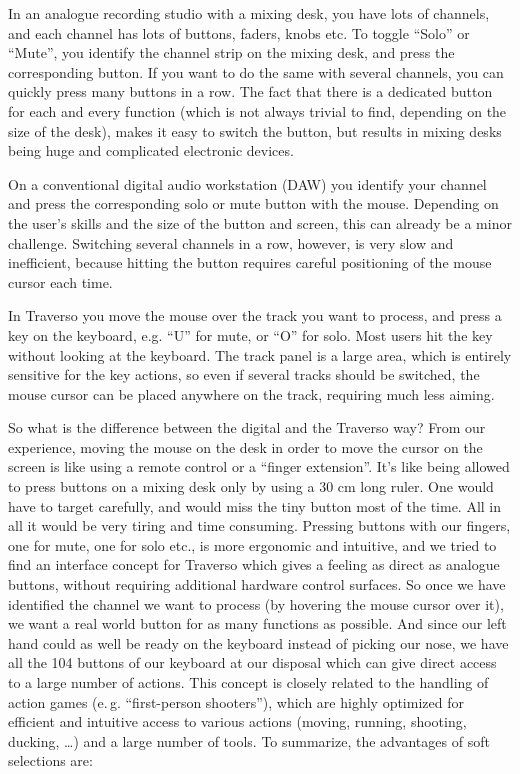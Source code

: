 In an analogue recording studio with a mixing desk, you have lots of channels, and each channel has lots of buttons, faders, knobs etc. To toggle ``Solo'' or ``Mute'', you identify the channel strip on the mixing desk, and press the corresponding button. If you want to do the same with several channels, you can quickly press many buttons in a row. The fact that there is a dedicated button for each and every function (which is not always trivial to find, depending on the size of the desk), makes it easy to switch the button, but results in mixing desks being huge and complicated electronic devices.

On a conventional digital audio workstation (DAW) you identify your channel and press the corresponding solo or mute button with the mouse. Depending on the user's skills and the size of the button and screen, this can already be a minor challenge. Switching several channels in a row, however, is very slow and inefficient, because hitting the button requires careful positioning of the mouse cursor each time.

In Traverso you move the mouse over the track you want to process, and press a key on the keyboard, e.g. ``U'' for mute, or ``O'' for solo. Most users hit the key without looking at the keyboard. The track panel is a large area, which is entirely sensitive for the key actions, so even if several tracks should be switched, the mouse cursor can be placed anywhere on the track, requiring much less aiming.

So what is the difference between the digital and the Traverso way? From our experience, moving the mouse on the desk in order to move the cursor on the screen is like using a remote control or a ``finger extension''. It's like being allowed to press buttons on a mixing desk only by using a 30 cm long ruler. One would have to target carefully, and would miss the tiny button most of the time. All in all it would be very tiring and time consuming. Pressing buttons with our fingers, one for mute, one for solo etc., is more ergonomic and intuitive, and we tried to find an interface concept for Traverso which gives a feeling as direct as analogue buttons, without requiring additional hardware control surfaces. So once we have identified the channel we want to process (by hovering the mouse cursor over it), we want a real world button for as many functions as possible. And since our left hand could as well be ready on the keyboard instead of picking our nose, we have all the 104 buttons of our keyboard at our disposal which can give direct access to a large number of actions. This concept is closely related to the handling of action games (e.\,g. ``first-person shooters''), which are highly optimized for efficient and intuitive access to various actions (moving, running, shooting, ducking, \dots) and a large number of tools. To summarize, the advantages of soft selections are:

